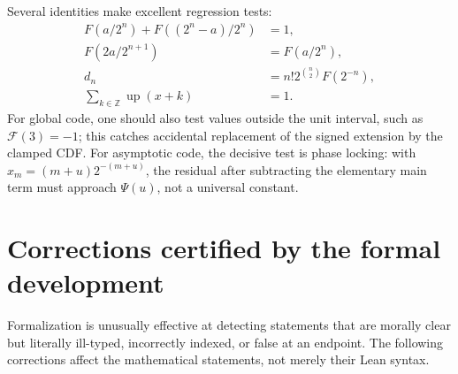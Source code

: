 \documentclass[11pt]{article}
\numberwithin{equation}{section}
\theoremstyle{definition}
\theoremstyle{remark}
\newcommand{\Z}{\mathbb Z}
\newcommand{\GF}{\mathcal F}
\newcommand{\upf}{\operatorname{up}}
\begin{document}
Several identities make excellent regression tests:
\begin{align}
 F(a/2^n)+F((2^n-a)/2^n)&=1,\label{p3:eq:test-symmetry}\\
 F(2a/2^{n+1})&=F(a/2^n),\label{p3:eq:test-refinement}\\
 d_n&=n!2^{\binom n2}F(2^{-n}),\label{p3:eq:test-inverse}\\
 \sum_{k\in\Z}\upf(x+k)&=1.\label{p3:eq:test-partition}
\end{align}
For global code, one should also test values outside the unit interval, such
as $\GF(3)=-1$; this catches accidental replacement of the signed extension
by the clamped CDF.  For asymptotic code, the decisive test is phase locking:
with $x_m=(m+u)2^{-(m+u)}$, the residual after subtracting the elementary main
term must approach $\Psi(u)$, not a universal constant.

\section{Corrections certified by the formal development}\label{p3:sec:corrections}

Formalization is unusually effective at detecting statements that are
morally clear but literally ill-typed, incorrectly indexed, or false at an
endpoint.  The following corrections affect the mathematical statements, not
merely their Lean syntax.
\end{document}

